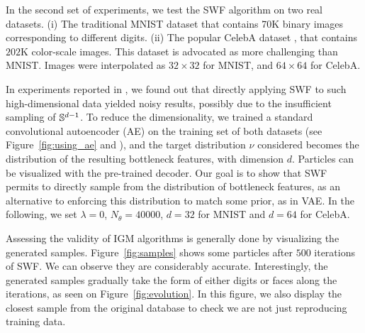In the second set of experiments, we test the SWF algorithm on two real datasets. (i) The traditional MNIST dataset that contains 70K binary images corresponding to different digits. (ii) The popular CelebA dataset \cite{liu2015faceattributes}, that contains $202$K color-scale images. This dataset is advocated as more challenging than MNIST. Images were interpolated as $32\times 32$ for MNIST, and $64\times 64$ for CelebA.

In experiments reported in \supp, we found out that directly applying SWF to such high-dimensional data yielded noisy results, possibly due to the insufficient sampling of $\mathbb{S}^{d-1}$. To reduce the dimensionality, we trained a standard convolutional autoencoder (AE) on the training set of both datasets (see Figure~\ref{fig:using_ae} and \supp), and the target distribution $\nu$ considered becomes the distribution of the resulting bottleneck features,
with dimension $d$. Particles can be visualized with the pre-trained decoder.
Our goal is to show that SWF permits to directly sample from the distribution of bottleneck features, as an alternative to enforcing this distribution to match some prior, as in VAE. In the following, we set $\lambda=0$, $N_\theta=40000$, $d=32$ for MNIST and $d=64$ for CelebA.


Assessing the validity of IGM algorithms is generally done by visualizing the generated samples. Figure~\ref{fig:samples} shows some particles after $500$ iterations of SWF. We can observe they are considerably accurate. Interestingly, the generated samples gradually take the form of either digits or faces along the iterations, as seen on Figure~\ref{fig:evolution}. In this figure, we also display the closest sample from the original database to check we are not just reproducing training data.

